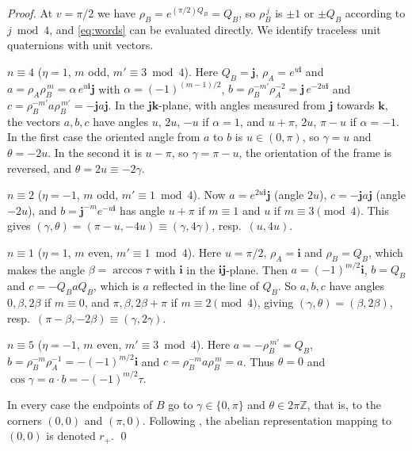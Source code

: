 \begin{proof}
At $v=\pi/2$ we have $\rho_B=e^{(\pi/2)Q_B}=Q_B$, so $\rho_B^{\,j}$ is $\pm1$ or $\pm Q_B$ according to $j\bmod4$, and
\eqref{eq:words} can be evaluated directly. We identify traceless unit quaternions with unit vectors.

\emph{$n\equiv4$} ($\eta=1$, $m$ odd, $m'\equiv3\bmod4$). Here $Q_B=\mathbf j$, $\rho_A=e^{u\mathbf i}$ and
$a=\rho_A\rho_B^{\,m}=\alpha\,e^{u\mathbf i}\mathbf j$ with $\alpha=(-1)^{(m-1)/2}$, $b=\rho_B^{-m'}\rho_A^{-2}=\mathbf j\,e^{-2u\mathbf i}$ and
$c=\rho_B^{-m'}a\rho_B^{\,m'}=-\mathbf j a\mathbf j$. In the $\mathbf j\mathbf k$-plane, with angles measured from $\mathbf j$ towards $\mathbf k$, the
vectors $a,b,c$ have angles $u$, $2u$, $-u$ if $\alpha=1$, and $u+\pi$, $2u$, $\pi-u$ if $\alpha=-1$. In the first case
the oriented angle from $a$ to $b$ is $u\in(0,\pi)$, so $\gamma=u$ and $\theta=-2u$. In the second it is $u-\pi$, so
$\gamma=\pi-u$, the orientation of the frame is reversed, and $\theta=2u\equiv-2\gamma$.

\emph{$n\equiv2$} ($\eta=-1$, $m$ odd, $m'\equiv1\bmod4$). Now $a=e^{2u\mathbf i}\mathbf j$ (angle $2u$),
$c=-\mathbf j a\mathbf j$ (angle $-2u$), and $b=\mathbf j^{-m}e^{-u\mathbf i}$ has angle $u+\pi$ if $m\equiv1$ and $u$ if
$m\equiv3\pmod4$. This gives $(\gamma,\theta)=(\pi-u,-4u)\equiv(\gamma,4\gamma)$, resp.\ $(u,4u)$.

\emph{$n\equiv1$} ($\eta=1$, $m$ even, $m'\equiv1\bmod4$). Here $u=\pi/2$, $\rho_A=\mathbf i$ and $\rho_B=Q_B$, which makes the
angle $\beta=\arccos\tau$ with $\mathbf i$ in the $\mathbf i\mathbf j$-plane. Then $a=(-1)^{m/2}\mathbf i$, $b=Q_B$ and
$c=-Q_BaQ_B$, which is $a$ reflected in the line of $Q_B$. So $a,b,c$ have angles $0,\beta,2\beta$ if $m\equiv0$, and
$\pi,\beta,2\beta+\pi$ if $m\equiv2\pmod4$, giving $(\gamma,\theta)=(\beta,2\beta)$, resp.\ $(\pi-\beta,-2\beta)\equiv(\gamma,2\gamma)$.

\emph{$n\equiv5$} ($\eta=-1$, $m$ even, $m'\equiv3\bmod4$). Here $a=-\rho_B^{\,m'}=Q_B$, $b=\rho_B^{-m}\rho_A^{-1}=-(-1)^{m/2}\mathbf i$ and
$c=\rho_B^{-m}a\rho_B^{\,m}=a$. Thus $\theta=0$ and $\cos\gamma=a\cdot b=-(-1)^{m/2}\tau$.

In every case the endpoints of $B$ go to $\gamma\in\{0,\pi\}$ and $\theta\in2\pi\mathbb Z$, that is, to the corners $(0,0)$ and
$(\pi,0)$. Following \cite[\S\S5.3, 6.1]{HHK2}, the abelian representation mapping to $(0,0)$ is denoted $r_+$. \qed
\end{proof}

